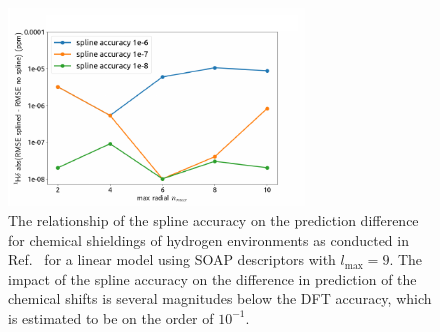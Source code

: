 \begin{figure}
    \centering
    \includegraphics[width=0.7\textwidth]{fig/spline-accuracy-v2.pdf}
    \caption{The relationship of the spline accuracy on the prediction difference for chemical shieldings of hydrogen environments as conducted in Ref.~\cite{paruzzo2018chemical} for a linear model using SOAP descriptors with $l_\textrm{max}=9$.
    The impact of the spline accuracy on the difference in prediction of the chemical shifts is several magnitudes below the DFT accuracy, which is estimated to be on the order of $10^{-1}$.}
    \label{fig:chemical_shift-spline}
\end{figure}

